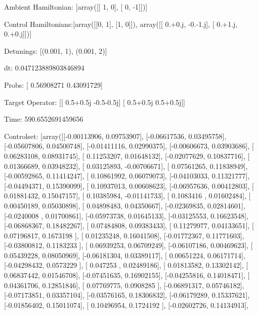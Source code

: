 \documentclass{article}
\begin{document}
    

\newpage

Ambient Hamiltonian: [array([[ 1,  0],
       [ 0, -1]])]

Control Hamiltonians:[array([[0, 1],
       [1, 0]]), array([[ 0.+0.j, -0.-1.j],
       [ 0.+1.j,  0.+0.j]])]

Detunings: [(0.001, 1), (0.001, 2)]

 dt: 0.047123889803846894

Probs: [ 0.56908271  0.43091729]

Target Operator: [[ 0.5+0.5j -0.5-0.5j]
 [ 0.5+0.5j  0.5+0.5j]]

Time: 590.6552691459656

Controlset: [array([[-0.00113906,  0.09753907],
       [-0.06617536,  0.03495758],
       [-0.05607806,  0.04500748],
       [-0.01411116,  0.02990375],
       [-0.00606673,  0.03903686],
       [ 0.06283108,  0.08931745],
       [ 0.11253207,  0.01648132],
       [-0.02077629,  0.10837716],
       [ 0.01366689,  0.03948232],
       [ 0.03125893, -0.00706671],
       [ 0.07561265,  0.11838949],
       [-0.00592865,  0.11414247],
       [ 0.10861992,  0.06079073],
       [-0.04103033,  0.11321777],
       [-0.04494371,  0.15390099],
       [ 0.10937013,  0.00608623],
       [-0.06957636,  0.00412803],
       [ 0.01881432,  0.15047157],
       [ 0.10385984, -0.01141733],
       [ 0.1083416 ,  0.01602484],
       [ 0.00450189,  0.05030898],
       [ 0.04898483,  0.04350667],
       [-0.02369835,  0.02814601],
       [-0.0240008 ,  0.01700861],
       [-0.05973738,  0.01645133],
       [-0.03125553,  0.16623548],
       [-0.06868367,  0.18482267],
       [ 0.07484808,  0.09383433],
       [ 0.11279977,  0.04133651],
       [ 0.07196817,  0.1673198 ],
       [ 0.01235248,  0.16041508],
       [-0.01772367,  0.11771603],
       [-0.03800812,  0.1183233 ],
       [ 0.06939253,  0.06709249],
       [-0.06107186,  0.00469623],
       [ 0.05439228,  0.08050969],
       [-0.06181304,  0.03389117],
       [ 0.00651224,  0.06171714],
       [-0.04298432,  0.0573229 ],
       [ 0.047253  ,  0.02489186],
       [ 0.01813582,  0.13302142],
       [ 0.06837442,  0.01546708],
       [-0.07451635,  0.16902155],
       [-0.04255816,  0.14018471],
       [ 0.04361706,  0.12851846],
       [ 0.07769775,  0.0908285 ],
       [-0.06891317,  0.05746182],
       [-0.07173851,  0.03357104],
       [-0.03576165,  0.18306832],
       [-0.06179289,  0.15337621],
       [-0.01856402,  0.15011074],
       [ 0.10496954,  0.1724192 ],
       [-0.02602726,  0.14134913],
\end{document}
